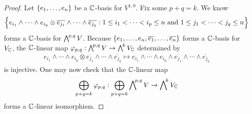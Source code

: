 \documentclass{report}
\begin{document}
\begin{proof}
Let $\{ e_1,\dots ,e_n \}$ be a $\mathbb{C}$-basis for  $V^{1,0}$. Fix some  $p+q=k$. We know 
\begin{align*}
\Big\{ e_{i_1}\wedge  \cdots \wedge  e_{i_p}\otimes \overline{e_{j_1}}\wedge  \cdots \wedge  \overline{e_{j_q}}: 1\leq i_1<\cdots <i_p \leq n\text{ and }1\leq j_1<\cdots <j_q \leq n \Big\}
\end{align*}
forms a $\mathbb{C}$-basis for $\extp^{p,q}V$. Because $\{ e_1,\dots ,e_n, \overline{e_1},\dots ,\overline{e_n} \}$ forms a $\mathbb{C}$-basis for $V_{\mathbb{C}}$, the $\mathbb{C}$-linear map $\phi_{p,q}:\extp^{p,q}V\rightarrow \extp^{k}V_\C$ determined by 
\begin{align*}
  e_{i_1}\wedge  \cdots \wedge  e_{i_p}\otimes \overline{e_{j_1}}\wedge  \cdots \wedge  \overline{e_{j_q}}\mapsto e_{i_1}\wedge  \cdots \wedge  e_{i_p}\wedge   \overline{e_{j_1}}\wedge  \cdots \wedge  \overline{e_{j_q}}
\end{align*}
is injective. One may now check that the $\mathbb{C}$-linear map
\begin{align*}
\bigoplus_{p+q=k}\phi_{p,q}: \bigoplus_{p+q=k}\extp^{p,q} V \rightarrow \extp^k V_\C
\end{align*}
forms a $\mathbb{C}$-linear isomorphism. 
\end{proof}
\end{document}
